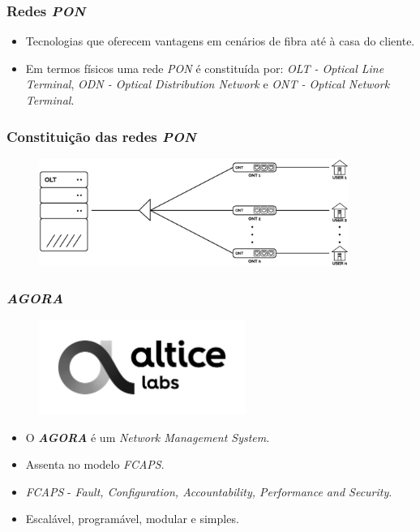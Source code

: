 \begin{frame}
    \frametitle{Redes \textit{PON}}
    \begin{itemize}
        \item Tecnologias que oferecem vantagens em cenários de fibra até à casa do cliente.
        \item Em termos físicos uma rede \textit{PON} é constituída por:
        \textit{OLT - Optical Line Terminal}, \textit{ODN - Optical Distribution
        Network} e \textit{ONT - Optical Network Terminal}.
    \end{itemize}
\end{frame}

\begin{frame}
    \frametitle{Constituição das redes \textit{PON}}
    \centering
    \begin{figure}
        \includegraphics[width=0.9\textwidth]{./assets/estado_de_arte/rede_pon.png}
    \end{figure}    
\end{frame}    

\begin{frame}
    \frametitle{\textit{\textbf{AGORA}}}
    \begin{figure}
        \includegraphics[width=0.6\textwidth]{./assets/estado_de_arte/alticelabs_logo.png}
    \end{figure}    
    \begin{itemize}
        \item O \textit{\textbf{AGORA}} é um \textit{Network Management System}.
        \item Assenta no modelo \textit{FCAPS}.
        \item \textit{FCAPS} - \textit{Fault, Configuration, Accountability,
        Performance and Security}.
        \item Escalável, programável, modular e simples.
    \end{itemize}    
\end{frame}    

